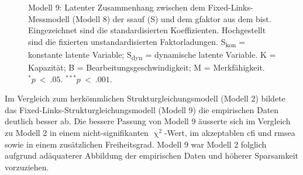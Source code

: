 \documentclass[11pt, twoside, a4paper]{book}		%
\begin{document}
\begin{figure}[htbp]
\begin{adjustbox}{width=1\textwidth}
	\end{adjustbox}
	
	\vspace{.2cm}
	\caption[Modell 9: Fixed-Links-Strukturgleichungsmodell zwischen der \gls{ssauf} und dem \gls{gfaktor}]{Modell 9: Latenter Zusammenhang zwischen dem Fixed-Links-Messmodell (Modell 8) der \gls{ssauf} (\textsf{S}) und dem \gls{gfaktor} aus dem \gls{bist}. Eingezeichnet sind die standardisierten Koeffizienten. Hochgestellt sind die fixierten unstandardisierten Faktorladungen. \textsf{S\textsubscript{kon}} = konstante latente Variable; \textsf{S\textsubscript{dyn}} = dynamische latente Variable. \textsf{K} = Kapazität; \textsf{B} = Bearbeitungsgeschwindigkeit; \textsf{M} = Merkfähigkeit.\\
	$^{*}p~<~.05$. $^{***}p~<~.001$.
	}
	\label{fig:spatialsuppression_fixedlinks_sem}
\end{figure} 

Im Vergleich zum herkömmlichen Strukturgleichungsmodell (Modell 2) bildete das Fixed-Links-Strukturgleichungsmodell (Modell 9) die empirischen Daten deutlich besser ab. Die bessere Passung von Modell 9 äusserte sich im Vergleich zu Modell 2 in einem nicht-signifikanten $\upchi^2$-Wert, im akzeptablen \gls{cfi} und \gls{rmsea} sowie in einem zusätzlichen Freiheitsgrad. Modell 9 war Modell 2 folglich aufgrund adäquaterer Abbildung der empirischen Daten und höherer Sparsamkeit vorzuziehen. 
\end{document}
